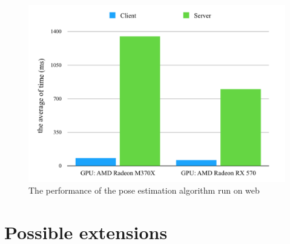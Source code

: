  \begin{figure}[htbp]
	\centerline{\includegraphics[scale=0.7]{fig/web-performace.png}}  
	\caption{The performance of the pose estimation algorithm run on web}
	\label{fig:web-perf}
\end{figure}

\section{Possible extensions}


